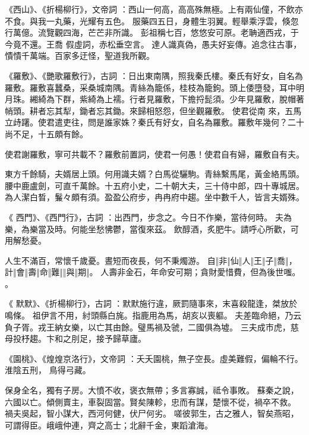\begin{pinyinscope}
《西山》、《折楊柳行》，文帝詞
 ：西山一何高，高高殊無極。上有兩仙僮，不飲亦不食。與我一丸藥，光耀有五色。
 服藥四五日，身體生羽翼。輕舉乘浮雲，倏忽行萬億。流覽觀四海，芒芒非所識。
 彭祖稱七百，悠悠安可原。老聃適西戎，于今竟不還。王喬
 假虛詞，赤松垂空言。
 達人識真偽，愚夫好妄傳。追念往古事，憒憒千萬端。百家多迂怪，聖道我所觀。


《羅敷》、《艷歌羅敷行》，古詞
 ：日出東南隅，照我秦氏樓。秦氏有好女，自名為羅敷。羅敷喜蠶桑，采桑城南隅。青絲為籠係，桂枝為籠鉤。頭上倭墮發，耳中明月珠。緗綺為下群，紫綺為上襦。行者見羅敷，下擔捋髭須。少年見羅敷，脫帽著帩頭。耕者忘其犁，鋤者忘其鋤。來歸相怒怨，但坐觀羅敷。
 使君從南
 來，五馬立歭躇。使君遣吏往，問是誰家姝？秦氏有好女，自名為羅敷。羅敷年幾何？二十尚不足，十五頗有餘。



 使君謝羅敷，寧可共載不？羅敷前置詞，使君一何愚！使君自有婦，羅敷自有夫。


 東方千餘騎，夫婿居上頭。何用識夫婿？白馬從驪駒。青絲繫馬尾，黃金絡馬頭。腰中鹿盧劍，可直千萬餘。十五府小史，二十朝大夫，三十侍中郎，四十專城居。為人潔白晳，鬑々頗有須。盈盈公府步，冉冉府中趨。坐中數千人，皆言夫婿殊。


《
 西門》、《西門行》，古詞
 ：出西門，步念之。今日不作樂，當待何時。
 夫為樂，為樂當及時。何能坐愁怫鬱，當復來茲。
 飲醇酒，炙肥牛。請呼心所歡，可用解愁憂。


 人生不滿百，常懷千歲憂。晝短而夜長，何不秉燭游。
 自‖非‖仙‖人‖王‖子‖喬‖，計‖會‖壽‖命‖難‖‖與‖期‖。
 人壽非金石，年命安可期；貪財愛惜費，但為後世嗤。
 。


《
 默默》、《折楊柳行》，古詞
 ：默默施行違，厥罰隨事來，末喜殺龍逢，桀放於鳴條。
 祖伊言不用，紂頭縣白旄。指鹿用為馬，胡亥以喪軀。
 夫差臨命絕，乃云負子胥。戎王納女樂，以亡其由餘。璧馬禍及虢，二國俱為墟。
 三夫成市虎，慈母投杼趨。卞和之刖足，接予歸草廬。


《園桃》、《煌煌京洛行》，文帝詞
 ：夭夭園桃，無子空長。虛美難假，偏輪不行。
 淮陰五刑，
 鳥得弓藏。


保身全名，獨有子房。大憤不收，褒衣無帶；多言寡誠，祗令事敗。
 蘇秦之說，六國以亡。傾側賣主，車裂固當。賢矣陳軫，忠而有謀，楚懷不從，禍卒不救。
 禍夫吳起，智小謀大，西河何健，伏尸何劣。
 嗟彼郭生，古之雅人，智矣燕昭，可謂得臣。峨峨仲連，齊之高士；北辭千金，東蹈滄海。



\end{pinyinscope}
